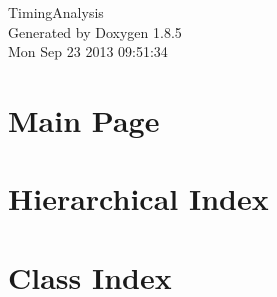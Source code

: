 \documentclass[twoside]{book}
\newcommand{\clearemptydoublepage}{%
  \newpage{\pagestyle{empty}\cleardoublepage}%
}
\begin{document}
\hypersetup{pageanchor=false}
\begin{titlepage}
\vspace*{7cm}
\begin{center}%
{\Large Timing\-Analysis }\\
\vspace*{1cm}
{\large Generated by Doxygen 1.8.5}\\
\vspace*{0.5cm}
{\small Mon Sep 23 2013 09:51:34}\\
\end{center}
\end{titlepage}
\clearemptydoublepage
\tableofcontents
\clearemptydoublepage
{}
\hypersetup{pageanchor=true}

\chapter{Main Page}
\label{index}\hypertarget{index}{}
\chapter{Hierarchical Index}

\chapter{Class Index}

\end{document}

